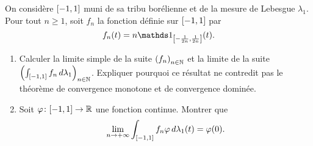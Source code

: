 \begin{td-exo}[] %
    On considère \(\mathopen{}\left[-1,1\right]\mathclose{}\) muni de sa tribu borélienne et de la mesure de
    Lebesgue \(\lambda_1\). Pour tout \(n\geq 1\), soit \(f_n\) la fonction
    définie sur \(\mathopen{}\left[-1,1\right]\mathclose{}\) par
    \begin{equation*}
        f_n(t) = n\one_{\ff{-\frac{1}{2n},\frac{1}{2n}}}(t).
    \end{equation*}
    \begin{enumerate}
        \item Calculer la limite simple de la suite \(\left(f_n\right)_{n\in\mathbb{N}}\) et
        la limite de la suite \(\left(\int_{\mathopen{}\left[-1,1\right]\mathclose{}}f_n\mathop{}\!{d}\lambda_1\right)_{n\in\mathbb{N}}\).
        Expliquer pourquoi ce résultat ne contredit pas le théorème de convergence
        monotone et de convergence dominée.

        \item Soit \(\varphi\colon\mathopen{}\left[-1,1\right]\mathclose{}\to\mathbb{R}\) une fonction continue. Montrer que
        \begin{equation*}
            \lim_{n\to+\infty}\int_{\mathopen{}\left[-1,1\right]\mathclose{}}f_n\varphi\mathop{}\!{d}\lambda_1(t) = \varphi(0).
        \end{equation*}
    \end{enumerate}
\end{td-exo}

